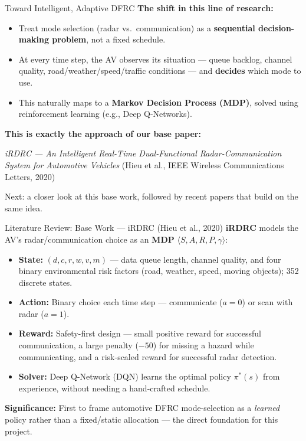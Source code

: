 \documentclass[aspectratio=169]{beamer}
\begin{document}
\begin{frame}{Toward Intelligent, Adaptive DFRC}
  \textbf{The shift in this line of research:}
  \begin{itemize}
    \item Treat mode selection (radar vs.\ communication) as a \textbf{sequential decision-making problem}, not a fixed schedule.
    \item At every time step, the AV observes its situation --- queue backlog, channel quality, road/weather/speed/traffic conditions --- and \textbf{decides} which mode to use.
    \item This naturally maps to a \textbf{Markov Decision Process (MDP)}, solved using reinforcement learning (e.g., Deep Q-Networks).
  \end{itemize}

  \vspace{0.3cm}
  \textbf{This is exactly the approach of our base paper:}
  \begin{center}
    \textit{iRDRC --- An Intelligent Real-Time Dual-Functional Radar-Communication System for Automotive Vehicles} (Hieu et al., IEEE Wireless Communications Letters, 2020)
  \end{center}
  \small Next: a closer look at this base work, followed by recent papers that build on the same idea.
\end{frame}


\begin{frame}{Literature Review: Base Work --- iRDRC (Hieu et al., 2020)}
  \small
  \textbf{iRDRC} models the AV's radar/communication choice as an \textbf{MDP} $\langle S, A, R, P, \gamma \rangle$:
  \begin{itemize}
    \item \textbf{State:} $(d, c, r, w, v, m)$ --- data queue length, channel quality, and four binary environmental risk factors (road, weather, speed, moving objects); 352 discrete states.
    \item \textbf{Action:} Binary choice each time step --- communicate ($a=0$) or scan with radar ($a=1$).
    \item \textbf{Reward:} Safety-first design --- small positive reward for successful communication, a large penalty ($-50$) for missing a hazard while communicating, and a risk-scaled reward for successful radar detection.
    \item \textbf{Solver:} Deep Q-Network (DQN) learns the optimal policy $\pi^*(s)$ from experience, without needing a hand-crafted schedule.
  \end{itemize}
  \vspace{0.15cm}
  \textbf{Significance:} First to frame automotive DFRC mode-selection as a \emph{learned} policy rather than a fixed/static allocation --- the direct foundation for this project.
\end{frame}
\end{document}
